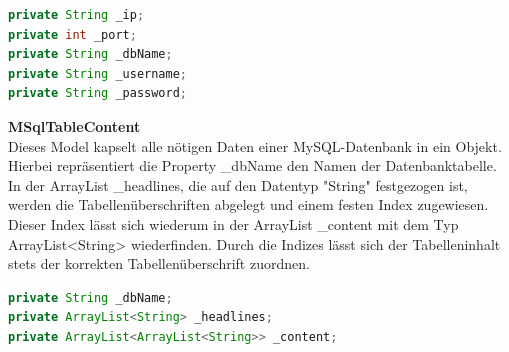 \begin{lstlisting}[caption=Parameter für eine MySQL-Datenbankverbindung, language=Java]
private String _ip;
private int _port;
private String _dbName;
private String _username;
private String _password;
\end{lstlisting}
\textbf{MSqlTableContent}\\
Dieses Model kapselt alle nötigen Daten einer MySQL-Datenbank in ein Objekt. Hierbei repräsentiert die Property {\_}dbName den Namen der Datenbanktabelle. In der ArrayList {\_}headlines, die auf den Datentyp "String" festgezogen ist, werden die Tabellenüberschriften abgelegt und einem festen Index zugewiesen. Dieser Index lässt sich wiederum in der ArrayList {\_}content mit dem Typ ArrayList<String> wiederfinden. Durch die Indizes lässt sich der Tabelleninhalt stets der korrekten Tabellenüberschrift zuordnen.

\begin{lstlisting}[caption=Repräsentation einer MySQL-Tabelle als Java-Objekt, language=Java]
private String _dbName;
private ArrayList<String> _headlines;
private ArrayList<ArrayList<String>> _content;
\end{lstlisting}

